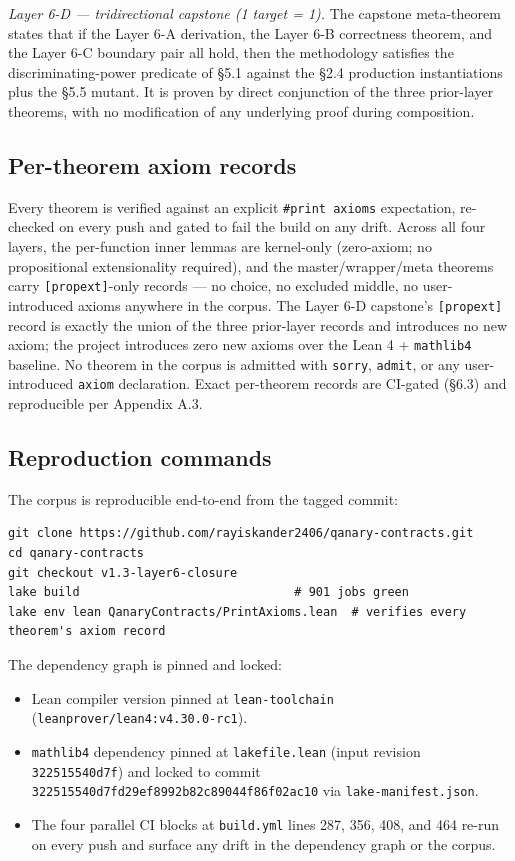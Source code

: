\emph{Layer 6-D --- tridirectional capstone (1 target = 1).} The
capstone meta-theorem states that if the Layer 6-A derivation, the Layer
6-B correctness theorem, and the Layer 6-C boundary pair all hold, then
the methodology satisfies the discriminating-power predicate of §5.1
against the §2.4 production instantiations plus the §5.5 mutant. It is
proven by direct conjunction of the three prior-layer theorems, with no
modification of any underlying proof during composition.

\subsection{Per-theorem axiom records}\label{per-theorem-axiom-records}

Every theorem is verified against an explicit \texttt{\#print\ axioms}
expectation, re-checked on every push and gated to fail the build on any
drift. Across all four layers, the per-function inner lemmas are
kernel-only (zero-axiom; no propositional extensionality required), and
the master/wrapper/meta theorems carry \texttt{{[}propext{]}}-only
records --- no choice, no excluded middle, no user-introduced axioms
anywhere in the corpus. The Layer 6-D capstone's \texttt{{[}propext{]}}
record is exactly the union of the three prior-layer records and
introduces no new axiom; the project introduces zero new axioms over the
Lean 4 + \texttt{mathlib4} baseline. No theorem in the corpus is
admitted with \texttt{sorry}, \texttt{admit}, or any user-introduced
\texttt{axiom} declaration. Exact per-theorem records are CI-gated
(§6.3) and reproducible per Appendix A.3.

\subsection{Reproduction commands}\label{reproduction-commands}

The corpus is reproducible end-to-end from the tagged commit:

\begin{verbatim}
git clone https://github.com/rayiskander2406/qanary-contracts.git
cd qanary-contracts
git checkout v1.3-layer6-closure
lake build                              # 901 jobs green
lake env lean QanaryContracts/PrintAxioms.lean  # verifies every theorem's axiom record
\end{verbatim}

The dependency graph is pinned and locked:

\begin{itemize}
\tightlist
\item
  Lean compiler version pinned at \texttt{lean-toolchain}
  (\texttt{leanprover/lean4:v4.30.0-rc1}).
\item
  \texttt{mathlib4} dependency pinned at \texttt{lakefile.lean} (input
  revision \texttt{322515540d7f}) and locked to commit
  \texttt{322515540d7fd29ef8992b82c89044f86f02ac10} via
  \texttt{lake-manifest.json}.
\item
  The four parallel CI blocks at \texttt{build.yml} lines 287, 356, 408,
  and 464 re-run on every push and surface any drift in the dependency
  graph or the corpus.
\end{itemize}

